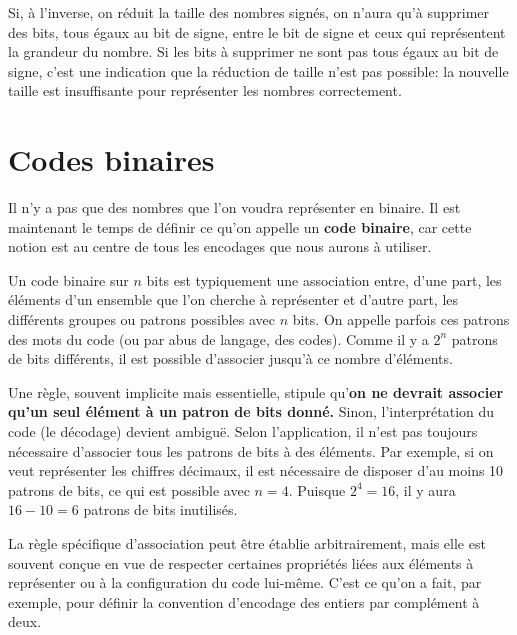\documentclass[letter, oneside]{book}
\begin{document}
\begin{enumerate}
Si, à l'inverse, on réduit la taille des nombres signés, on n'aura
qu'à supprimer des bits, tous égaux au bit de signe, entre le bit de
signe et ceux qui représentent la grandeur du nombre. Si les bits à
supprimer ne sont pas tous égaux au bit de signe, c'est une indication
que la réduction de taille n'est pas possible: la nouvelle taille est
insuffisante pour représenter les nombres correctement.
\end{enumerate}


\section{Codes binaires}
\label{sec:org9d34914}

Il n'y a pas que des nombres que l'on voudra représenter en
binaire. Il est maintenant le temps de définir ce qu'on appelle un
\textbf{code binaire}, car cette notion est au centre de tous les encodages
que nous aurons à utiliser.

Un code binaire sur \(n\) bits est typiquement une association entre,
d'une part, les éléments d'un ensemble que l'on cherche à représenter
et d'autre part, les différents groupes ou patrons possibles avec
\(n\) bits. On appelle parfois ces patrons des mots du code (ou par abus
de langage, des codes). Comme il y a \(2^n\) patrons de bits
différents, il est possible d'associer jusqu'à ce nombre
d'éléments.

Une règle, souvent implicite mais essentielle, stipule qu'\textbf{on
ne devrait associer qu'un seul élément à un patron de bits donné.}
Sinon, l'interprétation du code (le décodage) devient ambiguë. Selon
l'application, il n'est pas toujours nécessaire d'associer tous les
patrons de bits à des éléments. Par exemple, si on veut représenter
les chiffres décimaux, il est nécessaire de disposer d'au moins 10
patrons de bits, ce qui est possible avec \(n=4\). Puisque \(2^4 =
16\), il y aura \(16 - 10 = 6\) patrons de bits inutilisés.

La règle spécifique d'association peut être établie arbitrairement,
mais elle est souvent conçue en vue de respecter certaines propriétés
liées aux éléments à représenter ou à la configuration du code
lui-même. C'est ce qu'on a fait, par exemple, pour définir la
convention d'encodage des entiers par complément à deux.
\end{document}
